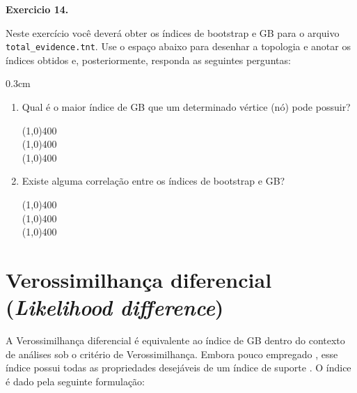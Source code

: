 \begin{refsection}
\begin{blackBlock}{\textbf{Exercicio 14.}}\label{tut14:ex:14.4}

Neste exercício você deverá obter os índices de bootstrap e GB para o arquivo \texttt{total\_evidence.tnt}. Use o espaço abaixo para desenhar a topologia e anotar os índices obtidos e, posteriormente, responda as seguintes perguntas:

\end{blackBlock}

\vspace{120pt}


\begin {myindentpar}{0.3cm}
\begin{enumerate}[\itshape i.]

	\item{Qual é o maior índice de GB que um determinado vértice (nó) pode possuir?}


\begin{center}
\line(1,0){400}\\
\line(1,0){400}\\
\line(1,0){400}\\
\end{center}


	\item{Existe alguma correlação entre os índices de bootstrap e GB?}

\begin{center}
\line(1,0){400}\\
\line(1,0){400}\\
\line(1,0){400}\\
\end{center}

\end{enumerate}
\end{myindentpar}

\section{Verossimilhança diferencial (\textit{Likelihood difference})}\label{tut14:lkr}

A Verossimilhança diferencial é equivalente ao índice de GB dentro do contexto de análises sob o critério de Verossimilhança. Embora pouco empregado \parencite[veja referências em][]{GrantKluge2008b, machado_et_al_2022}, esse índice possui todas as propriedades desejáveis de um índice de suporte \parencite[][]{Edwards_1992,GrantKluge2008b}. O índice é dado pela seguinte formulação:


\end{refsection}

